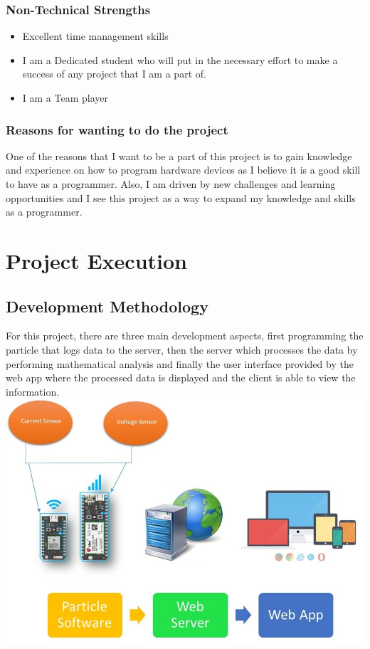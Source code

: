 \documentclass[a4paper,12pt]{article}
\begin{document}
\subsubsection{Non-Technical Strengths}
\begin{itemize}
    \item Excellent time management skills
    \item I am a Dedicated student who will put in the necessary effort to make a success of any project that I am a part of.
    \item I am a Team player
\end{itemize}
\subsubsection{Reasons for wanting to do the project}
One of the reasons that I want to be a part of this project is to gain knowledge and experience on how to program hardware devices as I believe it is a good skill to have as a programmer. Also, I am driven by new challenges and learning opportunities and I see this project as a way to expand my knowledge and skills as a programmer.
\newpage
\section{Project Execution}
\subsection{Development Methodology}
For this project, there are three main development aspects, first programming the particle that logs data to the server, then the server which processes the data by performing mathematical analysis and finally the user interface provided by the web app where the processed data is displayed and the client is able to view the information.\\
\includegraphics[width=\textwidth]{pcDevMeth.jpg}
\end{document}
